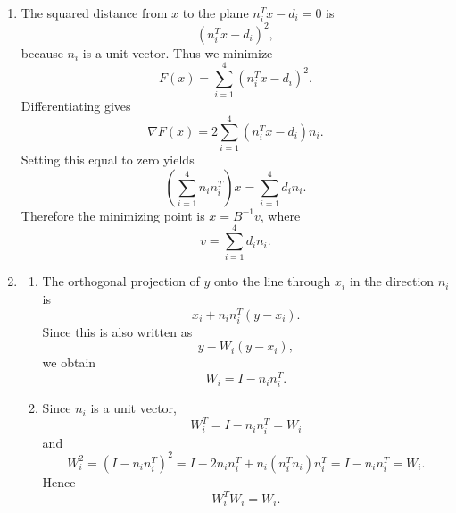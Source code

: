 \documentclass[10pt,a4paper]{article}
\begin{document}
\begin{enumerate}
  \item The squared distance from $x$ to the plane $n_i^Tx-d_i=0$ is
        \[
          (n_i^Tx-d_i)^2,
        \]
        because $n_i$ is a unit vector. Thus we minimize
        \[
          F(x)=\sum_{i=1}^4(n_i^Tx-d_i)^2.
        \]
        Differentiating gives
        \[
          \nabla F(x)=2\sum_{i=1}^4(n_i^Tx-d_i)n_i.
        \]
        Setting this equal to zero yields
        \[
          \left(\sum_{i=1}^4 n_in_i^T\right)x
          =
          \sum_{i=1}^4d_in_i.
        \]
        Therefore the minimizing point is $x=B^{-1}v$, where
        \[
          \boxed{
          v=\sum_{i=1}^4d_in_i.}
        \]

  \item
        \begin{enumerate}
          \item The orthogonal projection of $y$ onto the line through $x_i$ in the direction $n_i$ is
                \[
                  x_i+n_in_i^T(y-x_i).
                \]
                Since this is also written as
                \[
                  y-W_i(y-x_i),
                \]
                we obtain
                \[
                  \boxed{
                  W_i=I-n_in_i^T.}
                \]

          \item Since $n_i$ is a unit vector,
                \[
                  W_i^T=I-n_in_i^T=W_i
                \]
                and
                \[
                  W_i^2
                  =
                  (I-n_in_i^T)^2
                  =
                  I-2n_in_i^T+n_i(n_i^Tn_i)n_i^T
                  =
                  I-n_in_i^T
                  =
                  W_i.
                \]
                Hence
                \[
                  \boxed{W_i^TW_i=W_i.}
                \]


\end{enumerate}
\end{enumerate}
\end{document}

